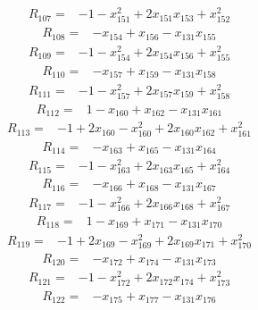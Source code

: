 \begin{align*}
R_{107} ={}& -1 - x_{151}^{2} + 2x_{151} x_{153} + x_{152}^{2}
\end{align*}
\begin{align*}
R_{108} ={}& -x_{154} + x_{156} - x_{131} x_{155}
\end{align*}
\begin{align*}
R_{109} ={}& -1 - x_{154}^{2} + 2x_{154} x_{156} + x_{155}^{2}
\end{align*}
\begin{align*}
R_{110} ={}& -x_{157} + x_{159} - x_{131} x_{158}
\end{align*}
\begin{align*}
R_{111} ={}& -1 - x_{157}^{2} + 2x_{157} x_{159} + x_{158}^{2}
\end{align*}
\begin{align*}
R_{112} ={}& 1 - x_{160} + x_{162} - x_{131} x_{161}
\end{align*}
\begin{align*}
R_{113} ={}& -1 + 2x_{160} - x_{160}^{2} + 2x_{160} x_{162} + x_{161}^{2}
\end{align*}
\begin{align*}
R_{114} ={}& -x_{163} + x_{165} - x_{131} x_{164}
\end{align*}
\begin{align*}
R_{115} ={}& -1 - x_{163}^{2} + 2x_{163} x_{165} + x_{164}^{2}
\end{align*}
\begin{align*}
R_{116} ={}& -x_{166} + x_{168} - x_{131} x_{167}
\end{align*}
\begin{align*}
R_{117} ={}& -1 - x_{166}^{2} + 2x_{166} x_{168} + x_{167}^{2}
\end{align*}
\begin{align*}
R_{118} ={}& 1 - x_{169} + x_{171} - x_{131} x_{170}
\end{align*}
\begin{align*}
R_{119} ={}& -1 + 2x_{169} - x_{169}^{2} + 2x_{169} x_{171} + x_{170}^{2}
\end{align*}
\begin{align*}
R_{120} ={}& -x_{172} + x_{174} - x_{131} x_{173}
\end{align*}
\begin{align*}
R_{121} ={}& -1 - x_{172}^{2} + 2x_{172} x_{174} + x_{173}^{2}
\end{align*}
\begin{align*}
R_{122} ={}& -x_{175} + x_{177} - x_{131} x_{176}
\end{align*}
